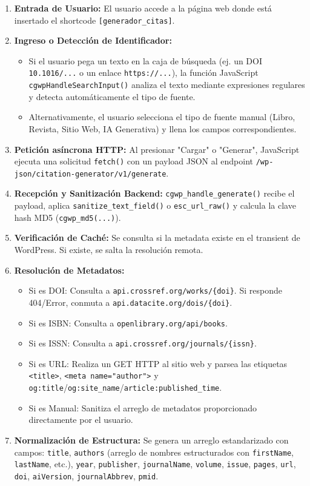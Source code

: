 \documentclass[11pt, a4paper]{article}
\begin{document}
\begin{enumerate}
\item \textbf{Entrada de Usuario:} El usuario accede a la página web donde está insertado el shortcode \texttt{[generador\_citas]}.
\item \textbf{Ingreso o Detección de Identificador:}
\begin{itemize}
\item Si el usuario pega un texto en la caja de búsqueda (ej. un DOI \texttt{10.1016/...} o un enlace \texttt{https://...}), la función JavaScript \texttt{cgwpHandleSearchInput()} analiza el texto mediante expresiones regulares y detecta automáticamente el tipo de fuente.
\item Alternativamente, el usuario selecciona el tipo de fuente manual (Libro, Revista, Sitio Web, IA Generativa) y llena los campos correspondientes.
\end{itemize}
\item \textbf{Petición asíncrona HTTP:} Al presionar "Cargar" o "Generar", JavaScript ejecuta una solicitud \texttt{fetch()} con un payload JSON al endpoint \texttt{/wp-json/citation-generator/v1/generate}.
\item \textbf{Recepción y Sanitización Backend:} \texttt{cgwp\_handle\_generate()} recibe el payload, aplica \texttt{sanitize\_text\_field()} o \texttt{esc\_url\_raw()} y calcula la clave hash MD5 (\texttt{cgwp\_md5(...)}).
\item \textbf{Verificación de Caché:} Se consulta si la metadata existe en el transient de WordPress. Si existe, se salta la resolución remota.
\item \textbf{Resolución de Metadatos:}
\begin{itemize}
\item Si es DOI: Consulta a \texttt{api.crossref.org/works/\{doi\}}. Si responde 404/Error, conmuta a \texttt{api.datacite.org/dois/\{doi\}}.
\item Si es ISBN: Consulta a \texttt{openlibrary.org/api/books}.
\item Si es ISSN: Consulta a \texttt{api.crossref.org/journals/\{issn\}}.
\item Si es URL: Realiza un GET HTTP al sitio web y parsea las etiquetas \texttt{<title>}, \texttt{<meta name="author">} y \texttt{og:title}/\texttt{og:site\_name}/\texttt{article:published\_time}.
\item Si es Manual: Sanitiza el arreglo de metadatos proporcionado directamente por el usuario.
\end{itemize}
\item \textbf{Normalización de Estructura:} Se genera un arreglo estandarizado con campos: \texttt{title}, \texttt{authors} (arreglo de nombres estructurados con \texttt{firstName}, \texttt{lastName}, etc.), \texttt{year}, \texttt{publisher}, \texttt{journalName}, \texttt{volume}, \texttt{issue}, \texttt{pages}, \texttt{url}, \texttt{doi}, \texttt{aiVersion}, \texttt{journalAbbrev}, \texttt{pmid}.

\end{enumerate}
\end{document}
